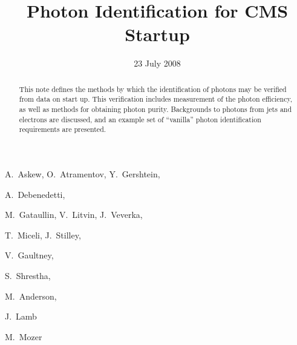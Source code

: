 \documentclass{cmspaper}
\begin{document}

\begin{titlepage}

   \date{23 July 2008}

  \title{Photon Identification for CMS Startup}

  \begin{Authlist}
    A.~Askew, O.~Atramentov, Y.~Gershtein,

    A.~Debenedetti,

    M.~Gataullin, V.~Litvin, J.~Veverka, 

    T.~Miceli, J.~Stilley,

    V.~Gaultney,

    S.~Shrestha,

    M.~Anderson,

    J.~Lamb

    M.~Mozer

  \end{Authlist}


  \begin{abstract}
This note defines the methods by which the identification of photons may be verified from data
on start up.  This verification includes measurement of the photon efficiency, as well as methods
for obtaining photon purity.  Backgrounds to photons from jets and electrons are discussed, and an
example set of ``vanilla'' photon identification requirements are presented. 
  \end{abstract} 

  
\end{titlepage}
\tableofcontents
\listoffigures
\listoftables
\pagebreak
\end{document}

